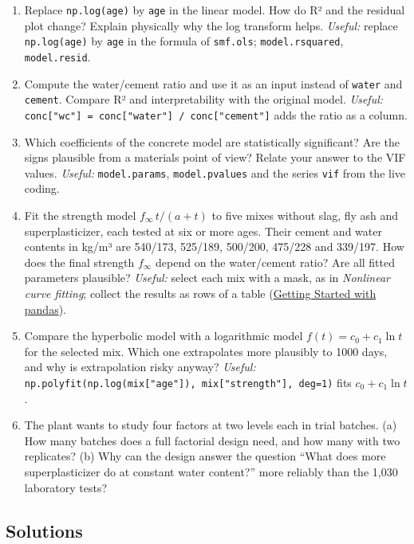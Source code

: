 \documentclass[
  letterpaper,
  DIV=11,
  numbers=noendperiod]{scrreprt}
\providecommand{\tightlist}{%
  \setlength{\itemsep}{0pt}\setlength{\parskip}{0pt}}\usepackage{longtable,booktabs,array}
\begin{document}
\begin{enumerate}
\def\labelenumi{\arabic{enumi}.}
\tightlist
\item
  Replace \texttt{np.log(age)} by \texttt{age} in the linear model. How
  do R² and the residual plot change? Explain physically why the log
  transform helps. \emph{Useful:} replace \texttt{np.log(age)} by
  \texttt{age} in the formula of \texttt{smf.ols};
  \texttt{model.rsquared}, \texttt{model.resid}.
\item
  Compute the water/cement ratio and use it as an input instead of
  \texttt{water} and \texttt{cement}. Compare R² and interpretability
  with the original model. \emph{Useful:}
  \texttt{conc{[}"wc"{]}\ =\ conc{[}"water"{]}\ /\ conc{[}"cement"{]}}
  adds the ratio as a column.
\item
  Which coefficients of the concrete model are statistically
  significant? Are the signs plausible from a materials point of view?
  Relate your answer to the VIF values. \emph{Useful:}
  \texttt{model.params}, \texttt{model.pvalues} and the series
  \texttt{vif} from the live coding.
\item
  Fit the strength model \(f_\infty\,t/(a+t)\) to five mixes without
  slag, fly ash and superplasticizer, each tested at six or more ages.
  Their cement and water contents in kg/m³ are 540/173, 525/189,
  500/200, 475/228 and 339/197. How does the final strength \(f_\infty\)
  depend on the water/cement ratio? Are all fitted parameters plausible?
  \emph{Useful:} select each mix with a mask, as in \emph{Nonlinear
  curve fitting}; collect the results as rows of a table
  (\href{00-pandas.ipynb}{Getting Started with pandas}).
\item
  Compare the hyperbolic model with a logarithmic model
  \(f(t) = c_0 + c_1 \ln t\) for the selected mix. Which one
  extrapolates more plausibly to 1000 days, and why is extrapolation
  risky anyway? \emph{Useful:}
  \texttt{np.polyfit(np.log(mix{[}"age"{]}),\ mix{[}"strength"{]},\ deg=1)}
  fits \(c_0 + c_1 \ln t\).
\item
  The plant wants to study four factors at two levels each in trial
  batches. (a) How many batches does a full factorial design need, and
  how many with two replicates? (b) Why can the design answer the
  question ``What does more superplasticizer do at constant water
  content?'' more reliably than the 1,030 laboratory tests?
\end{enumerate}

\subsection{Solutions}\label{solutions-5}
\end{document}
